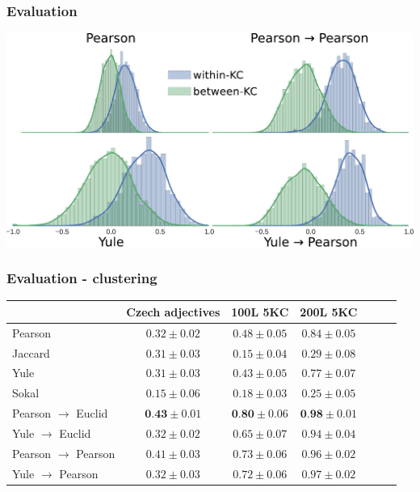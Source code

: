 \documentclass[xcolor=svgnames]{beamer}
\begin{document}
\begin{frame}
    \frametitle{Evaluation}
    \includegraphics[width=\linewidth]{figures/measure-histograms2}
\end{frame}
\begin{frame}
    \frametitle{Evaluation - clustering}
    \begin{tabular}{lcccccc}
        \toprule
                                   & Czech adjectives           &  100L 5KC             & 200L 5KC             \\
        \midrule

        Pearson                       & $        0.32 \pm 0.02$ &  $        0.48 \pm 0.05$ & $        0.84 \pm 0.05$ \\
        Jaccard                       & $        0.31 \pm 0.03$ &  $        0.15 \pm 0.04$ & $        0.29 \pm 0.08$ \\
        Yule                          & $        0.31 \pm 0.03$ &  $        0.43 \pm 0.05$ & $        0.77 \pm 0.07$ \\
        Sokal                         & $        0.15 \pm 0.06$ &  $        0.18 \pm 0.03$ & $        0.25 \pm 0.05$ \\
        Pearson $\rightarrow$ Euclid  & $\textbf{0.43}\pm 0.01$ &  $\textbf{0.80}\pm 0.06$ & $\textbf{0.98}\pm 0.01$ \\
        Yule    $\rightarrow$ Euclid  & $        0.32 \pm 0.02$ &  $        0.65 \pm 0.07$ & $        0.94 \pm 0.04$ \\
        Pearson $\rightarrow$ Pearson & $        0.41 \pm 0.03$ &  $        0.73 \pm 0.06$ & $        0.96 \pm 0.02$ \\
        Yule    $\rightarrow$ Pearson & $        0.32 \pm 0.03$ &  $        0.72 \pm 0.06$ & $        0.97 \pm 0.02$ \\
      \bottomrule
    \end{tabular}
\end{frame}
\end{document}
